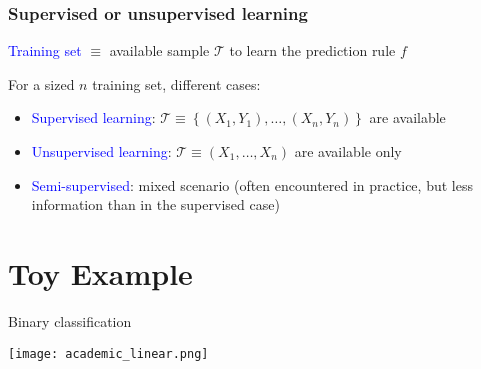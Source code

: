 \message{ !name(intro.tex)}\documentclass[pressentation,9pt,aspectratio=1610,xcolor=table]{beamer}
\newcommand{\structuretext}[1]{{\textcolor{blue}{#1}}}
\begin{document}
\begin{frame}
  \frametitle{Supervised or unsupervised learning}

  \structuretext{Training set} $\equiv$ available sample  $\mathcal{T}$ to learn the prediction rule $f$ \medskip 
  
  For a sized $n$ training set, different cases:
  \begin{itemize}
  \item \structuretext{Supervised learning}:  $ \mathcal{T} \equiv \left\{ (X_1,Y_1), \ldots, (X_n,Y_n) \right\}$ are available
  \item \structuretext{Unsupervised learning}: $ \mathcal{T} \equiv \left( X_1, \ldots, X_n \right)$ are available only 
  \item \structuretext{Semi-supervised}: mixed scenario (often encountered in practice, but less information than in the supervised case)
  \end{itemize} 
\end{frame}

\section{Toy Example}

\begin{frame}{Binary classification}
  \begin{center}
    \texttt{[image: academic\_linear.png]}
  \end{center}
\end{frame}
  
\end{document}
